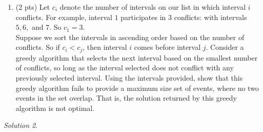 \documentclass[12pt]{article}
\theoremstyle{remark}
\newtheorem*{solution}{Solution}
\begin{document}
\begin{enumerate}
\begin{enumerate}[label=(\alph*)]
\begin{solution}
\end{solution}

\newpage
\item (2 pts) Let $c_{i}$ denote the number of intervals on our list in which interval $i$ conflicts. For example, interval $1$ participates in $3$ conflicts: with intervals $5, 6,$ and $7$. So $c_{1} = 3$. \\

\noindent Suppose we sort the intervals in ascending order based on the number of conflicts. So if $c_{i} < c_{j}$, then interval $i$ comes before interval $j$. Consider a greedy algorithm that selects the next interval based on the smallest number of conflicts, so long as the interval selected does not conflict with any previously selected interval. Using the intervals provided, show that this greedy algorithm fails to provide a maximum size set of events, where no two events in the set overlap. That is, the solution returned by this greedy algorithm is not optimal.
\end{enumerate}

\begin{solution}

\end{solution}


\end{enumerate}
\end{document}
